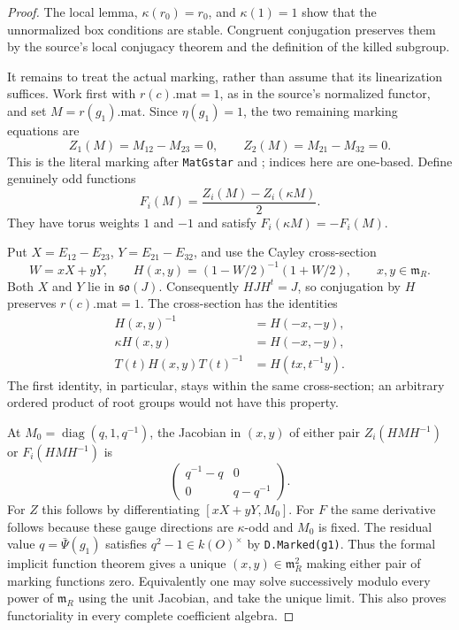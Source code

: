 \documentclass[11pt,a4paper]{article}
\theoremstyle{definition}
\begin{document}
\begin{proof}
The local lemma, $\kappa(r_0)=r_0$, and $\kappa(1)=1$ show that
the unnormalized box conditions are stable.  Congruent
conjugation preserves them by the source's local conjugacy
theorem and the definition of the killed subgroup.

It remains to treat the actual marking, rather than assume
that its linearization suffices.  Work first with
$r(c).\mathrm{mat}=1$, as in the source's normalized functor,
and set $M=r(g_1).\mathrm{mat}$.  Since $\eta(g_1)=1$, the two
remaining marking equations are
\[
 Z_1(M)=M_{12}-M_{23}=0,\qquad
 Z_2(M)=M_{21}-M_{32}=0.                                    \tag{KP.8}
\]
This is the literal marking after
\texttt{MatGstar} and ; indices here
are one-based.  Define genuinely odd functions
\[
           F_i(M)=\frac{Z_i(M)-Z_i(\kappa M)}2.              \tag{KP.9}
\]
They have torus weights $1$ and $-1$ and satisfy
$F_i(\kappa M)=-F_i(M)$.

Put $X=E_{12}-E_{23}$, $Y=E_{21}-E_{32}$, and use the Cayley
cross-section
\[
 W=xX+yY,\qquad
 H(x,y)=(1-W/2)^{-1}(1+W/2),\qquad x,y\in\mathfrak m_R.
                                                                  \tag{KP.10}
\]
Both $X$ and $Y$ lie in $\mathfrak{so}(J)$.
Consequently $H J H^t=J$, so conjugation by $H$ preserves
$r(c).\mathrm{mat}=1$.  The cross-section has the identities
\[
 \begin{split}
 H(x,y)^{-1}&=H(-x,-y),\\
 \kappa H(x,y)&=H(-x,-y),\\
 T(t)H(x,y)T(t)^{-1}&=H(tx,t^{-1}y).
 \end{split}                                                    \tag{KP.11}
\]
The first identity, in particular, stays within the same
cross-section; an arbitrary ordered product of root groups
would not have this property.

At $M_0=\operatorname{diag}(q,1,q^{-1})$, the Jacobian in
$(x,y)$ of either pair
$Z_i(HMH^{-1})$ or $F_i(HMH^{-1})$ is
\[
               \begin{pmatrix}q^{-1}-q&0\\0&q-q^{-1}\end{pmatrix}.
                                                                  \tag{KP.12}
\]
For $Z$ this follows by differentiating $[xX+yY,M_0]$.
For $F$ the same derivative follows because these gauge
directions are $\kappa$-odd and $M_0$ is fixed.  The residual
value $q=\bar\Psi(g_1)$ satisfies $q^2-1\in k(O)^\times$
by \texttt{D.Marked(g1)}.  Thus the formal implicit function
theorem gives a unique $(x,y)\in\mathfrak m_R^2$ making either
pair of marking functions zero.  Equivalently one may solve
successively modulo every power of $\mathfrak m_R$ using the
unit Jacobian, and take the unique limit.  This also proves
functoriality in every complete coefficient algebra.


\end{proof}
\end{document}
